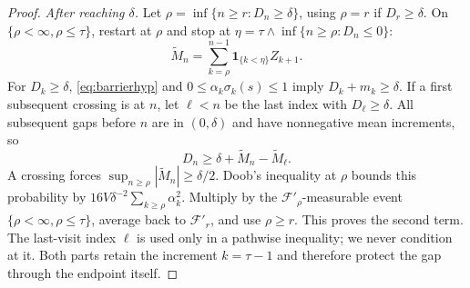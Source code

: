 \begin{proof}
\emph{After reaching $\delta$.} Let $\rho=\inf\{n\ge r:D_n\ge\delta\}$, using $\rho=r$ if $D_r\ge\delta$. On $\{\rho<\infty,\rho\le\tau\}$,
restart at $\rho$ and stop at $\eta=\tau\wedge\inf\{n\ge\rho:D_n\le0\}$:
\[
\widetilde M_n=\sum_{k=\rho}^{n-1}\mathbf1_{\{k<\eta\}}Z_{k+1}.
\]
For $D_k\ge\delta$, \eqref{eq:barrierhyp} and $0\le\alpha_k\sigma_k(s)\le1$ imply $D_k+m_k\ge\delta$. If a first subsequent crossing is
at $n$, let $\ell<n$ be the last index with $D_\ell\ge\delta$. All subsequent gaps before $n$ are in $(0,\delta)$ and
have nonnegative mean increments, so
\[
D_n\ge\delta+\widetilde M_n-\widetilde M_\ell.
\]
A crossing forces $\sup_{n\ge\rho}|\widetilde M_n|\ge\delta/2$. Doob's inequality at $\rho$ bounds this probability by
$16V\delta^{-2}\sum_{k\ge\rho}\alpha_k^2$. Multiply by the $\mathcal F'_\rho$-measurable event $\{\rho<\infty,\rho\le\tau\}$, average back to $\mathcal F'_r$,
and use $\rho\ge r$. This proves the second term. The last-visit index $\ell$ is used only in a pathwise
inequality; we never condition at it. Both parts retain the increment $k=\tau-1$ and therefore
protect the gap through the endpoint itself.
\end{proof}

